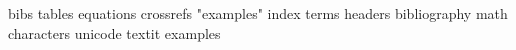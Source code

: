 bibs
tables
equations 
crossrefs
"examples"
index terms
headers
bibliography
math characters unicode
textit examples